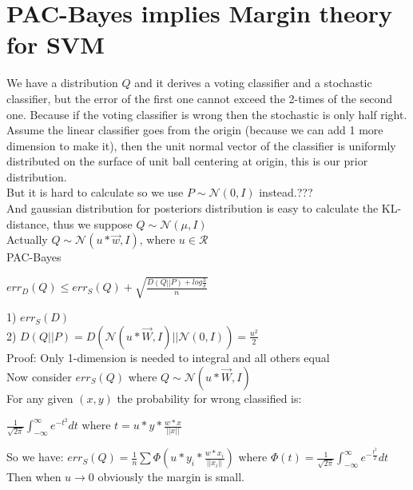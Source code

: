 \documentclass{article}
\begin{document}
\section{PAC-Bayes implies Margin theory for SVM}
We have a distribution $Q$ and it derives a voting classifier and a stochastic classifier, but the error of the first one cannot exceed the 2-times of the second one. Because if the voting classifier is wrong then the stochastic is only half right.
\\Assume the linear classifier goes from the origin (because we can add 1 more dimension to make it), then the unit normal vector of the classifier is uniformly distributed on the surface of unit ball centering at origin, this is our prior distribution.
\\But it is hard to calculate so we use $P\sim\mathcal{N}(0,I)$ instead.???
\\And gaussian distribution for posteriors distribution is easy to calculate the KL-distance, thus we suppose $Q\sim\mathcal{N}(\mu,I)$
\\Actually $Q\sim\mathcal{N}(u*\overrightarrow{w},I)$, where $u\in\mathcal{R}$
\\PAC-Bayes
\begin{center}
$err_D(Q)\leq err_S(Q)+\sqrt{\frac{D(Q||P)+log\frac{3}{\delta}}{n}}$
\end{center}
1) $err_S(D)$
\\2) $D(Q||P)=D(\mathcal{N}(u*\overrightarrow{W},I)||\mathcal{N}(0,I))=\frac{u^2}{2}$
\\Proof: Only 1-dimension is needed to integral and all others equal
\\Now consider $err_S(Q)$ where $Q\sim\mathcal{N}(u*\overrightarrow{W},I)$
\\For any given $(x,y)$ the probability for wrong classified is:
\begin{center}
$\frac{1}{\sqrt{2\pi}}\int_{-\infty}^{\infty}e^{-t^2}dt$ where $t=u*y*\frac{w*x}{||x||}$
\end{center}
So we have: $err_S(Q)=\frac{1}{n}\sum\Phi(u*y_i*\frac{w*x_i}{||x_i||})$ where $\Phi(t)=\frac{1}{\sqrt{2\pi}}\int_{-\infty}^{\infty}e^{-\frac{t^2}{2}}dt$
\\Then when $u\rightarrow 0$ obviously the margin is small.
\end{document}
